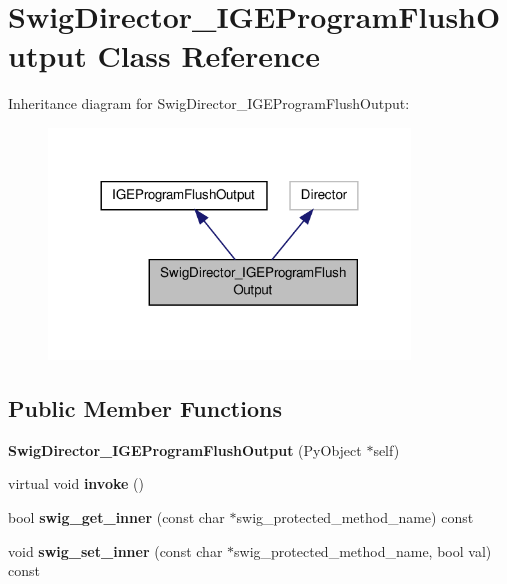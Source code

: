 \hypertarget{class_swig_director___i_g_e_program_flush_output}{\section{Swig\-Director\-\_\-\-I\-G\-E\-Program\-Flush\-Output Class Reference}
\label{class_swig_director___i_g_e_program_flush_output}
}


Inheritance diagram for Swig\-Director\-\_\-\-I\-G\-E\-Program\-Flush\-Output\-:\nopagebreak
\begin{figure}[H]
\begin{center}
\leavevmode
\includegraphics[width=272pt]{class_swig_director___i_g_e_program_flush_output__inherit__graph}
\end{center}
\end{figure}
\subsection*{Public Member Functions}
\begin{DoxyCompactItemize}
\item 
\hypertarget{class_swig_director___i_g_e_program_flush_output_a5793bc5515e9f0dff5456104c479f20f}{{\bfseries Swig\-Director\-\_\-\-I\-G\-E\-Program\-Flush\-Output} (Py\-Object $\ast$self)}\label{class_swig_director___i_g_e_program_flush_output_a5793bc5515e9f0dff5456104c479f20f}

\item 
\hypertarget{class_swig_director___i_g_e_program_flush_output_a472ce3a4f36e08b656eb3a4207bc3783}{virtual void {\bfseries invoke} ()}\label{class_swig_director___i_g_e_program_flush_output_a472ce3a4f36e08b656eb3a4207bc3783}

\item 
\hypertarget{class_swig_director___i_g_e_program_flush_output_ad363a6cf58af7f9521ecb759330414b4}{bool {\bfseries swig\-\_\-get\-\_\-inner} (const char $\ast$swig\-\_\-protected\-\_\-method\-\_\-name) const }\label{class_swig_director___i_g_e_program_flush_output_ad363a6cf58af7f9521ecb759330414b4}

\item 
\hypertarget{class_swig_director___i_g_e_program_flush_output_a629ad544a4d40a07c6119ac47aec875f}{void {\bfseries swig\-\_\-set\-\_\-inner} (const char $\ast$swig\-\_\-protected\-\_\-method\-\_\-name, bool val) const }\label{class_swig_director___i_g_e_program_flush_output_a629ad544a4d40a07c6119ac47aec875f}

\end{DoxyCompactItemize}


